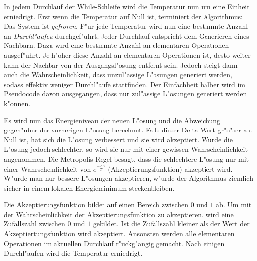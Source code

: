 In jedem Durchlauf der While-Schleife wird die Temperatur nun um eine Einheit erniedrigt. Erst wenn die Temperatur auf Null ist, terminiert der Algorithmus: Das System ist \emph{gefroren}. F"ur jede Temperatur wird nun eine bestimmte Anzahl an \emph{Durchl"aufen} durchgef"uhrt. Jeder Durchlauf entspricht dem Generieren eines Nachbarn. Dazu wird eine bestimmte Anzahl an elementaren Operationen ausgef"uhrt. Je h"oher diese Anzahl an elementaren Operationen ist, desto weiter kann der Nachbar von der Ausgangsl"osung entfernt sein. Jedoch steigt dann auch die Wahrscheinlichkeit, dass unzul"assige L"osungen generiert werden, sodass effektiv weniger Durchl"aufe stattfinden. Der Einfachheit halber wird im Pseudocode davon ausgegangen, dass nur zul"assige L"osungen generiert werden k"onnen. 

Es wird nun das Energieniveau der neuen L"osung und die Abweichung gegen"uber der vorherigen L"osung berechnet. Falls dieser Delta-Wert gr"o"ser als Null ist, hat sich die L"osung verbessert und sie wird akzeptiert. Wurde die L"osung jedoch schlechter, so wird sie nur mit einer gewissen Wahrscheinlichkeit angenommen. Die Metropolis-Regel besagt, dass die schlechtere L"osung nur mit einer Wahrscheinlichkeit von \(e^{\frac{-\Delta E}{T}}\) (Akzeptierungsfunktion) akzeptiert wird. W"urde man nur bessere L"osungen akzeptieren, w"urde der Algorithmus ziemlich sicher in einem lokalen Energieminimum steckenbleiben. 

Die Akzeptierungsfunktion bildet auf einen Bereich zwischen \(0\) und \(1\) ab. Um mit der Wahrscheinlichkeit der Akzeptierungsfunktion zu akzeptieren, wird eine Zufallszahl zwischen \(0\) und \(1\) gebildet. Ist die Zufallszahl kleiner als der Wert der Akzeptiertungsfunktion wird akzeptiert. Ansonsten werden alle elementaren Operationen im aktuellen Durchlauf r"uckg"angig gemacht. Nach einigen Durchl"aufen wird die Temperatur erniedrigt. 

